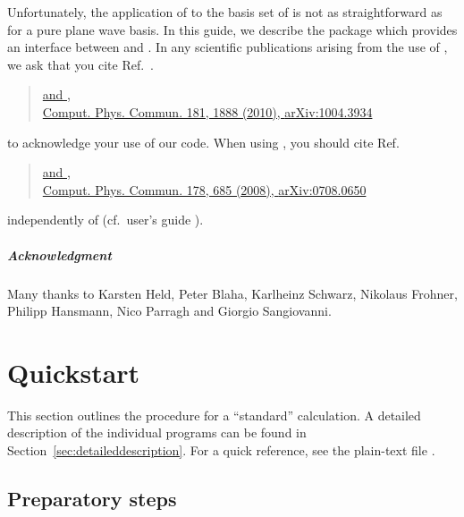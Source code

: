Unfortunately, the application of \wannier to the \lapw basis set of
\wien is not as straightforward as for a pure plane wave basis.  In
this guide, we describe the package \wtow which provides an interface
between \wien and \wannier.  In any scientific publications arising
from the use of \wtow, we ask that you cite Ref.~\cite{w2w}.
%
\begin{quote}
  \href{http://www.sciencedirect.com/science/article/pii/S0010465510002948}{
    and ,\\
    Comput. Phys. Commun. 181, 1888 (2010),
  }
  \href{http://arxiv.org/abs/1004.3934}{arXiv:1004.3934}
\end{quote}
%
to acknowledge your use of our code.  When using \wannier, you should
cite Ref.~\cite{wannier90_orig}
%
\begin{quote}
  \href{http://www.sciencedirect.com/science/article/pii/S0010465507004936}{
    and ,\\
    Comput. Phys. Commun. 178, 685 (2008),
  }
  \href{http://arxiv.org/abs/0708.0650}{arXiv:0708.0650}
\end{quote}
%
independently of \wtow (cf.~\wannier user's guide \cite{wannier90}).

\paragraph{Acknowledgment}
%
Many thanks to Karsten Held, Peter Blaha, Karlheinz Schwarz, Nikolaus
Frohner, Philipp Hansmann, Nico Parragh and Giorgio Sangiovanni.


\tableofcontents
\listoftodos

\mainmatter


\chapter{Quickstart}
\label{sec:quickstart}
\minitoc

This section outlines the procedure for a ``standard'' \wtow
calculation.  A detailed description of the individual programs can be
found in Section~\ref{sec:detaileddescription}.  For a quick
reference, see the plain-text file .


\section{Preparatory steps}
\label{sec:quickstart_prep}

